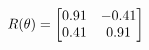 \documentclass[preview]{standalone}
\begin{document}
\begin{align*}
\special{dvisvgm:raw <g id='unique000'>}R(\theta) = \begin{bmatrix}0.91 & -0.41\\0.41 & 0.91\end{bmatrix}\special{dvisvgm:raw </g>}
\end{align*}
\end{document}
